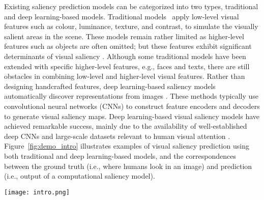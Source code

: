 \documentclass{article}
\begin{document}
Existing saliency prediction models can be categorized into two types, traditional and deep learning-based models. Traditional models~\cite{ITTI_2006, GBVS_2006, CovSal_2013, LDS} apply low-level visual features such as colour, luminance, texture, and contrast, to simulate the visually salient areas in the scene. These models remain rather limited as higher-level features such as objects are often omitted; but these features exhibit significant determinants of visual saliency \cite{STOLL201536,Wolfgang_2008}. Although some traditional models \cite{traditional_p1} have been extended with specific higher-level features, e.g., faces and texts, there are still obstacles in combining low-level and higher-level visual features. Rather than designing handcrafted features, deep learning-based saliency models automatically discover representations from images \cite{ML-Net, DVA_Wang, SAM_Cornia, MSI-Net, EML-NET, UNISAL, CASNET2, DeepGaze2, DP2E}. These methods typically use convolutional neural networks (CNNs) to construct feature encoders and decoders to generate visual saliency maps. Deep learning-based visual saliency models have achieved remarkable success, mainly due to the availability of well-established deep CNNs \cite{AlexNet, VGG, RESNET, DenseNet} and large-scale datasets relevant to human visual attention \cite{salicon2015}. Figure~\ref{fig:demo_intro} illustrates examples of visual saliency prediction using both traditional and deep learning-based models, and the correspondences between the ground truth (i.e., where humans look in an image) and prediction (i.e., output of a computational saliency model).

\begin{figure*}
\centering
\texttt{[image: intro.png]}
\caption{Examples of visual saliency prediction. The first row shows the images that stimulate the human eye to view freely. The so-called ``Ground Truth" in the second line refers to the fixation density maps, also called saliency maps, generated from the human fixation location. The third and fourth rows show the prediction results of the traditional (GBVS) and deep learning-based (SAM-ResNet) saliency models, respectively. Image (a) and (b) are from MIT1003 dataset; (c) and (d) are from SALICON dataset. It can be seen that both traditional and deep learning-based models are capable of capturing human viewing behaviour, but the deep learning-based model provides better results in demanding scenes, such as (b) and (d) to a considerable extent.}
\label{fig:demo_intro}
\end{figure*}
\end{document}
